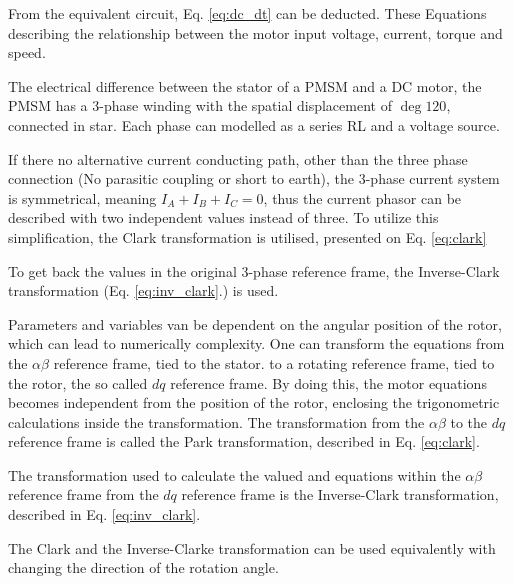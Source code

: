 \documentclass[twoside,b5paper,10pt]{article}
\begin{document}
From the equivalent circuit, Eq. \ref{eq:dc_dt} can be deducted. These Equations describing the relationship between the motor input voltage, current, torque and speed.



The electrical difference between the stator of a PMSM and a DC motor, the PMSM has a 3-phase winding with the spatial displacement of $\deg{120}$, connected in star. Each phase can modelled as a series RL and a voltage source. 



If there no alternative current conducting path, other than the three phase connection (No parasitic coupling or short to earth), the 3-phase current system is symmetrical, meaning $I_A + I_B + I_C = 0$, thus the current phasor can be described with two independent values instead of three. To utilize this simplification, the Clark transformation is utilised, presented on Eq. \ref{eq:clark}



To get back the values in the original 3-phase reference frame, the Inverse-Clark transformation (Eq. \ref{eq:inv_clark}.) is used.



Parameters and variables van be dependent on the angular position of the rotor, which can lead to numerically complexity. One can transform the equations from the $\alpha\beta$ reference frame, tied to the stator. to a rotating reference frame, tied to the rotor, the so called $dq$ reference frame. By doing this, the motor equations becomes independent from the position of the rotor, enclosing the trigonometric calculations inside the transformation. The transformation from the $\alpha{}\beta{}$ to the $dq$ reference frame is called the Park transformation, described in Eq. \ref{eq:clark}.



The transformation used to calculate the valued and equations within the $\alpha{}\beta{}$ reference frame from the $dq$ reference frame is the Inverse-Clark transformation, described in Eq. \ref{eq:inv_clark}. 



The Clark and the Inverse-Clarke transformation can be used equivalently with changing the direction of the rotation angle.


\end{document}
